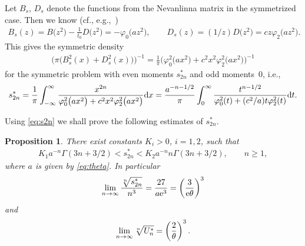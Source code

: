 \documentclass[pdftex]{sigma}
\numberwithin{equation}{section}
\newtheorem{prop}[thm]{Proposition}
\begin{document}
Let $B_s$, $D_s$ denote the functions from the Nevanlinna matrix in the symmetrized case. Then we know (cf., e.g.,~\cite[p.~48]{Be95})
\begin{gather*}
B_s(z)=B\big(z^2\big)-\frac{1}{t_0}D\big(z^2\big)=-\varphi_0\big(az^2\big),\qquad D_s(z)=(1/z)D\big(z^2\big)=c z\varphi_2\big(az^2\big).
\end{gather*}
This gives the symmetric density
\begin{gather*}
\big(\pi\big(B_s^2(x)+D_s^2(x)\big)\big)^{-1}=\frac{1}{\pi}\big(\varphi_0^2\big(ax^2\big)+c^2x^2\varphi_2^2\big(ax^2\big)\big)^{-1}
\end{gather*}
for the symmetric problem with even moments $s_{2n}^*$ and odd moments~0, i.e.,
\begin{gather}
s_{2n}^* = \frac{1}{\pi}\int_{-\infty}^\infty\frac{x^{2n}}{\varphi_0^2\big(ax^2\big)+c^2x^2\varphi_2^2\big(ax^2\big)}{\rm d}x
 = \frac{a^{-n-1/2}}{\pi}\int_0^\infty\frac{t^{n-1/2}}{\varphi_0^2(t)+(c^2/a)t\varphi_2^2(t)}{\rm d}t.\label{eq:s2n}
\end{gather}

Using \eqref{eq:s2n} we shall prove the following estimates of $s_{2n}^*$.

\begin{prop}\label{thm:s2n} There exist constants $K_i>0$, $i=1,2$, such that
\begin{gather}\label{eq:final}
K_1a^{-n}\Gamma(3n+3/2)<s_{2n}^*<K_2 a^{-n}n\Gamma(3n+3/2),\qquad n\ge 1,
\end{gather}
where $a$ is given by \eqref{eq:theta}. In particular
\begin{gather}\label{eq:final1}
\lim_{n\to\infty}\frac{\root{n}\of {s_{2n}^*}}{n^3}=\frac{27}{a{\rm e}^3}=\left(\frac{3}{{\rm e}\theta}\right)^3
\end{gather}
and
\begin{gather}\label{eq:Uncub}
\lim_{n\to\infty} \root{n}\of {U_n^*}=\left(\frac{2}{\theta}\right)^3.
\end{gather}
\end{prop}
\end{document}
